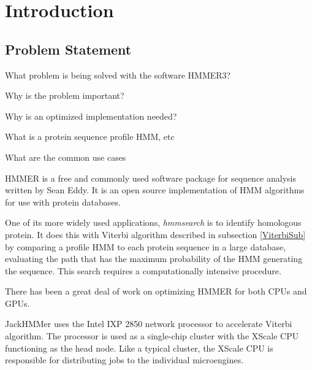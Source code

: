 
\chapter{Introduction} %



\section{Problem Statement}

What problem is being solved with the software HMMER3?

Why is the problem important?

Why is an optimized implementation needed?

What is a protein sequence profile HMM, etc

What are the common use cases



HMMER \citep{HMMER} is a free and commonly used software package for sequence analysis written by Sean Eddy. 
It is an open source implementation of HMM algorithms for use with protein databases.

One of its more widely used applications, \emph{hmmsearch} is to identify homologous protein. It does this with Viterbi algorithm described in subsection \ref{ViterbiSub} by comparing a profile HMM to each protein sequence in a large database, evaluating the path that has the maximum probability of the HMM generating the sequence.
This search requires a computationally intensive procedure.

There has been a great deal of work on optimizing HMMER for both CPUs and GPUs. 

JackHMMer \citep{Wun} uses the Intel IXP 2850 network processor to accelerate Viterbi algorithm. The processor is used as a single-chip cluster with the XScale CPU functioning as the head node. Like a typical cluster, the XScale CPU is responsible for distributing jobs to the individual microengines. 

